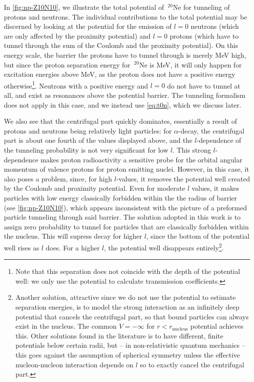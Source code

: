  In \autoref{fig:np-Z10N10}, we illustrate the total potential of $~^{20}\mathrm{Ne}$ for tunneling of protons and neutrons. The individual contributions to the total potential may be discerned by looking at the potential for the emission of $l=0$ neutrons (which are only affected by the proximity potential) and $l=0$ protons (which have to tunnel through the sum of the Coulomb and the proximity potential). %
On this energy scale, the barrier the protons have to tunnel through is merely \unit[2]{MeV} high, but since the proton separation energy for $~^{20}\mathrm{Ne}$ is \unit[12]{MeV}, it will only happen for excitation energies above \unit[12]{MeV}, as the proton does not have a positive energy otherwise\footnote{Note that this separation does not coincide with the depth of the potential well: we only use the potential to calculate transmission coefficients.}. Neutrons with a positive energy and $l=0$ do not have to tunnel at all, and exist as resonances above the potential barrier. The tunneling formalism does not apply in this case, and we instead use \eqref{eq:t0n}, which we discuss later.

We also see that the centrifugal part quickly dominates, essentially a result of protons and neutrons being relatively light particles: for $\alpha$-decay, the centrifugal part is about one fourth of the values displayed above, and the $l$-dependence of the tunneling probability is not very significant for low $l$\cite{weisskopf:1979}.  
This strong $l$-dependence makes proton radioactivity a sensitive probe for the orbital angular momentum of valence protons for proton emitting nuclei\cite{proton-alpha-proxy:2005}. However, in this case, it also poses a problem, since, for high $l$-values, it removes the potential well created by the Coulomb and proximity potential. Even for moderate $l$ values, it makes particles with low energy classically forbidden within the the radius of barrier (see \autoref{fig:np-Z10N10}), which appears inconsistent with the picture of a preformed particle tunneling through said barrier.
The solution adopted in this work is to assign zero probability to tunnel for particles that are classically forbidden within the nucleus. This will supress decay for higher $l$, since the bottom of the potential well rises as $l$ does. For a higher $l$, the potential well disappears entirely\footnote{Another solution, attractive since we do not use the potential to estimate separation energies, is to model the strong interaction as an infinitely deep potential that cancels the centrifugal part, so that bound particles can always exist in the nucleus. The common $V=-\infty$ for $r<r_\text{nucleus}$ potential achieves this. Other solutions found in the literature is to have different, finite potentials below certain radii, but -- in non-relativistic quantum mechanics -- this goes against the assumption of spherical symmetry unless the effective nucleon-nucleon interaction depends on $l$ so to exactly cancel the centrifugal part.}.

